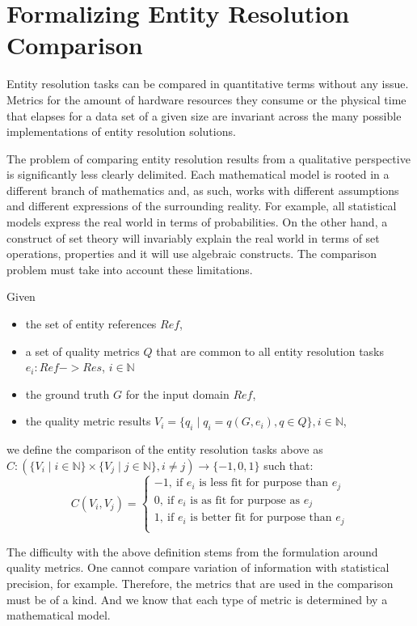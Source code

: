 \section[cert]{Formalizing Entity Resolution Comparison}\label{subsec:cert}

Entity resolution tasks can be compared in quantitative terms without any
issue.
Metrics for the amount of hardware resources they consume or the physical
time that elapses for a data set of a given size are invariant across the
many possible implementations of entity resolution solutions.

The problem of comparing entity resolution results from a qualitative
perspective is significantly less clearly delimited.
Each mathematical model is rooted in a different branch of mathematics and,
as such, works with different assumptions and different expressions of the
surrounding reality.
For example, all statistical models express the real world in terms of
probabilities.
On the other hand, a construct of set theory will invariably explain the
real world in terms of set operations, properties and it will use algebraic
constructs.
The comparison problem must take into account these limitations.

\begin{defn}
    Given
    \begin{itemize}
        \item the set of entity references $Ref$,
        \item a set of quality metrics $Q$ that are common to all
        entity resolution tasks $e_i : Ref -> Res$, $i \in \mathbb{N}$
        \item the ground truth $G$ for the input domain $Ref$,
        \item the quality metric results
        $V_i=\{q_{i} \mid q_{i} = q(G, e_i), q \in Q\}, i \in \mathbb{N}$,
    \end{itemize}   
    we define the comparison of the entity resolution tasks above as
    $C : (
        \{V_i \mid i \in \mathbb{N}\}
        \times
        \{V_j \mid j \in \mathbb{N}\},
        i \neq j
    ) \rightarrow \{-1, 0, 1\}$ such that:
    \[ 
C(V_i, V_j) = \left\{
\begin{array}{ll}
  -1,~\textrm{if $e_i$ is less fit for purpose than $e_j$}\\
  0,~\textrm{if $e_i$ is as fit for purpose as $e_j$}\\
  1,~\textrm{if $e_i$ is better fit for purpose than $e_j$}\\
\end{array} 
\right. 
\]

\end{defn}

The difficulty with the above definition stems from the formulation around
quality metrics.
One cannot compare variation of information with statistical precision, for
example.
Therefore, the metrics that are used in the comparison must be of a kind.
And we know that each type of metric is determined by a mathematical model.
